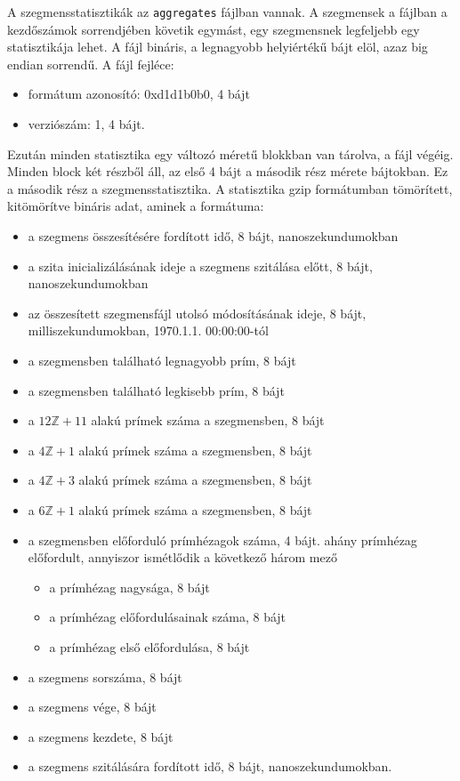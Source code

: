 A szegmensstatisztikák az \texttt{aggregates} fájlban vannak.
A szegmensek a fájlban a kezdőszámok sorrendjében követik egymást, egy szegmensnek legfeljebb egy statisztikája lehet.
A fájl bináris, a legnagyobb helyiértékű bájt elöl, azaz big endian sorrendű. A fájl fejléce:
\begin{itemize}
\item formátum azonosító: 0xd1d1b0b0, 4 bájt
\item verziószám: 1, 4 bájt.
\end{itemize}
Ezután minden statisztika egy változó méretű blokkban van tárolva, a fájl végéig.
Minden block két részből áll, az első 4 bájt a második rész mérete bájtokban.
Ez a második rész a szegmensstatisztika.
A statisztika gzip formátumban tömörített, kitömörítve bináris adat, aminek a formátuma:
\begin{itemize}
\item a szegmens összesítésére fordított idő, 8 bájt, nanoszekundumokban
\item a szita inicializálásának ideje a szegmens szitálása előtt, 8 bájt, nanoszekundumokban
\item az összesített szegmensfájl utolsó módosításának ideje, 8 bájt, milliszekundumokban, 1970.1.1. 00:00:00-tól
\item a szegmensben található legnagyobb prím, 8 bájt
\item a szegmensben található legkisebb prím, 8 bájt
\item a $12\mathbb{Z}+11$ alakú prímek száma a szegmensben, 8 bájt
\item a $4\mathbb{Z}+1$ alakú prímek száma a szegmensben, 8 bájt
\item a $4\mathbb{Z}+3$ alakú prímek száma a szegmensben, 8 bájt
\item a $6\mathbb{Z}+1$ alakú prímek száma a szegmensben, 8 bájt
\item a szegmensben előforduló prímhézagok száma, 4 bájt. ahány prímhézag előfordult, annyiszor ismétlődik a következő három mező
\begin{itemize}
\item a prímhézag nagysága, 8 bájt
\item a prímhézag előfordulásainak száma, 8 bájt
\item a prímhézag első előfordulása, 8 bájt
\end{itemize}
\item a szegmens sorszáma, 8 bájt
\item a szegmens vége, 8 bájt
\item a szegmens kezdete, 8 bájt
\item a szegmens szitálására fordított idő, 8 bájt, nanoszekundumokban.
\end{itemize}

